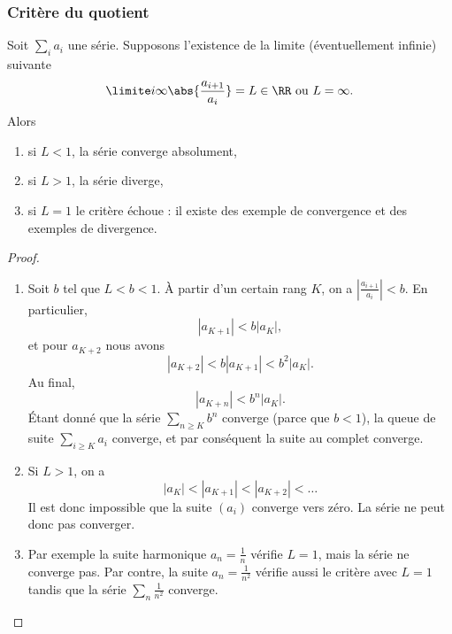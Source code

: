 \subsubsection{Critère du quotient}

\begin{proposition}
    Soit $\sum_i a_i$ une série. Supposons l'existence de la limite (éventuellement infinie) suivante
    \begin{equation}
      \limite i \infty \abs{\frac{a_{i+1}}{a_i}} = L\in \RR \text{ ou $L =
        \infty$.}
    \end{equation}
    Alors
    \begin{enumerate}
    \item si $L < 1$, la série converge absolument,
    \item si $L > 1$, la série diverge,
    \item si $L = 1$ le critère échoue : il existe des exemple de convergence et des exemples de divergence.
    \end{enumerate}
\end{proposition}

\begin{proof}
\begin{enumerate}
    \item
        Soit $b$ tel que $L<b<1$. À partir d'un certain rang $K$, on a $\left| \frac{ a_{i+1} }{ a_i } \right| <b$. En particulier,
        \begin{equation}
            | a_{K+1} |<b| a_K |,
        \end{equation}
        et pour $a_{K+2}$ nous avons
        \begin{equation}
            | a_{K+2} |<b| a_{K+1} |<b^2| a_K |.
        \end{equation}
        Au final,
        \begin{equation}
            | a_{K+n} |<b^n| a_K |.
        \end{equation}
        Étant donné que la série $\sum_{n\geq K}b^n$ converge (parce que $b<1$), la queue de suite $\sum_{i\geq K}a_i$ converge, et par conséquent la suite au complet converge.
    \item
        Si $L>1$, on a
        \begin{equation}
            | a_K |<| a_{K+1} |<| a_{K+2} |<\ldots
        \end{equation}
        Il est donc impossible que la suite $(a_i)$ converge vers zéro. La série ne peut donc pas converger.
    \item
        Par exemple la suite harmonique $a_n=\frac{1}{ n }$ vérifie $L=1$, mais la série ne converge pas. Par contre, la suite $a_n=\frac{ 1 }{ n^2 }$ vérifie aussi le critère avec $L=1$ tandis que la série $\sum_n\frac{1}{ n^2 }$ converge.
\end{enumerate}
\end{proof}

